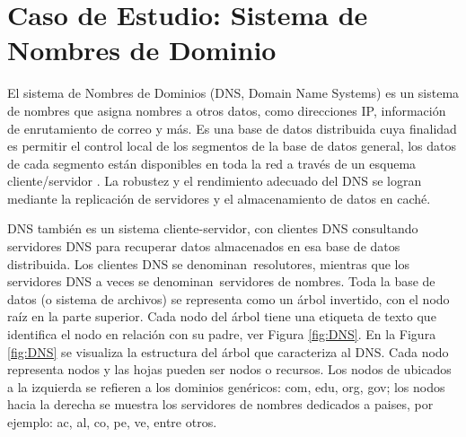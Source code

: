 
\section{Caso de Estudio: Sistema de Nombres de Dominio}
\label{cap:DNS}

El sistema de Nombres de Dominios (DNS, Domain Name Systems)  es un sistema de nombres que asigna nombres a otros datos, como direcciones IP, información de enrutamiento de correo y más. Es una base de datos distribuida  cuya finalidad es  permitir el control local de los segmentos de la base de datos general, los datos de cada segmento están disponibles en toda la red a través de un esquema cliente/servidor   \cite{Liu2011} \cite{Dostalek2006}.  La robustez y el rendimiento  adecuado del DNS se logran mediante la replicación de servidores  y el almacenamiento de datos en caché. 

DNS también es un sistema cliente-servidor, con clientes DNS consultando servidores DNS para recuperar datos almacenados en esa base de datos distribuida. Los clientes DNS  se denominan \gls{resolutores}, mientras que los servidores DNS a veces se denominan \gls{servidores de nombres}.
Toda la base de datos (o sistema de archivos) se representa como un árbol invertido, con el nodo raíz en la parte superior. Cada nodo del árbol tiene una etiqueta de texto que identifica el nodo en relación con su padre, ver Figura \ref{fig:DNS}.
En la Figura \ref{fig:DNS} se visualiza la estructura del árbol que caracteriza al DNS. Cada nodo representa nodos y las hojas pueden ser nodos o recursos. Los nodos de ubicados a la izquierda se refieren a los dominios genéricos: com, edu, org, gov; los nodos hacia la derecha se muestra los servidores de nombres dedicados a paises, por ejemplo: ac, al, co, pe, ve, entre otros. 

